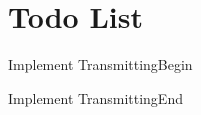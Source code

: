 \chapter{Todo List}
\hypertarget{todo}{}\label{todo}

\begin{DoxyRefList}
\item[File \doxylink{scGenComp__PU__Abstract_8h}{sc\+Gen\+Comp\+\_\+\+PU\+\_\+\+Abstract.h} ]\label{todo__todo000001}%
%
Implement Transmitting\+Begin 



Implement Transmitting\+End  
\item[File \doxylink{scGenComp__PU__Bio_8h}{sc\+Gen\+Comp\+\_\+\+PU\+\_\+\+Bio.h} ]\label{todo__todo000002}%
%
 
\end{DoxyRefList}